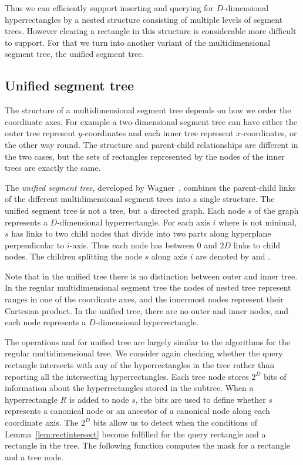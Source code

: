 \documentclass[english,gradu]{tktltiki2018}
\begin{document}
Thus we can efficiently support inserting and querying for $D$-dimensional hyperrectangles by a nested structure consisting of multiple levels of segment trees.
However clearing a rectangle in this structure is considerable more difficult to support.
For that we turn into another variant of the multidimensional segment tree, the unified segment tree.

\subsection{Unified segment tree}\label{sec:unifiedtree}

The structure of a multidimensional segment tree depends on how we order the coordinate axes.
For example a two-dimensional segment tree can have either the outer tree represent $y$-coordinates and each inner tree represent $x$-coordinates, or the other way round.
The structure and parent-child relationships are different in the two cases, but the sets of rectangles represented by the nodes of the inner trees are exactly the same.

The \emph{unified segment tree}, developed by Wagner~\cite{unified}, combines the parent-child links of the different multidimensional segment trees into a single structure.
The unified segment tree is not a tree, but a directed graph.
Each node $s$ of the graph represents a $D$-dimensional hyperrectangle.
For each axis $i$ where  is not minimal, $s$ has links to two child nodes that divide  into two parts along hyperplane perpendicular to $i$-axis.
Thus each node has between 0 and $2D$ links to child nodes.
The children splitting the node $s$ along axis $i$ are denoted by  and .

Note that in the unified tree there is no distinction between outer and inner tree.
In the regular multidimensional segment tree the nodes of nested tree represent ranges in one of the coordinate axes, and the innermost nodes represent their Cartesian product.
In the unified tree, there are no outer and inner nodes, and each node represents a $D$-dimensional hyperrectangle.

The operations \adddt and \checkdt for unified tree are largely similar to the algorithms for the regular multidimensional tree.
We consider again checking whether the query rectangle intersects with any of the hyperrectangles in the tree rather than reporting all the intersecting hyperrectangles.
Each tree node stores $2^D$ bits of information about the hyperrectangles stored in the subtree.
When a hyperrectangle $R$ is added to node $s$, the bits are used to define whether $s$ represents a canonical node or an ancestor of a canonical node along each coordinate axis.
The $2^D$ bits allow us to detect when the conditions of Lemma~\ref{lem:rectintersect} become fulfilled for the query rectangle and a rectangle in the tree.
The following function computes the mask for a rectangle and a tree node.
\end{document}
